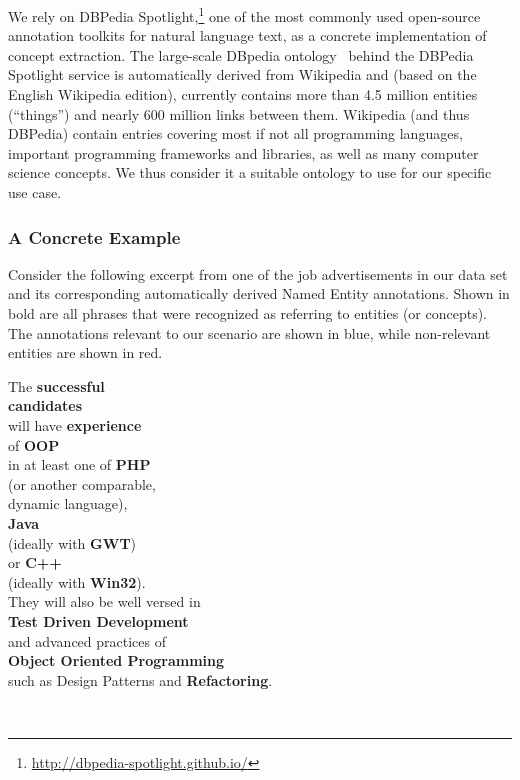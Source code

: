 \documentclass[conference]{IEEEtran}
\begin{document}
We rely on DBPedia Spotlight,\footnote{\url{http://dbpedia-spotlight.github.io/}}
one of the most commonly used open-source annotation toolkits for natural
language text, as a concrete implementation of concept extraction. The
large-scale DBpedia ontology~\cite{mendes2011dbpedia} behind the DBPedia Spotlight service is
automatically derived from Wikipedia and (based on the English Wikipedia edition),
currently contains more than 4.5 million entities (``things'') and nearly 600
million links between them. Wikipedia (and thus DBPedia) contain entries
covering most if not all programming languages, important programming
frameworks and libraries, as well as many computer science concepts. We thus
consider it a suitable ontology to use for our specific use case.

\subsubsection{A Concrete Example}
Consider the following excerpt from one of the job
advertisements in our data set and its corresponding automatically derived Named
Entity annotations. Shown in bold are all phrases that were recognized as
referring to entities (or concepts). The annotations relevant to our scenario
are shown in blue, while non-relevant entities are shown in red.

\vspace{1em}
{\small

\noindent The \textbf{successful} \\
\textbf{candidates}  \\
will have \textbf{experience} \\
of \textbf{OOP} \\
in at least one of \textbf{PHP} \\
(or another comparable,\\
dynamic language), \\
\textbf{Java} \\
(ideally with \textbf{GWT}) \\
or \textbf{C++} \\
(ideally with \textbf{Win32}). \\
They will also be well versed in\\
\textbf{Test Driven Development} \\
and advanced practices of\\
{\footnotesize\textbf{Object Oriented Programming}}  \\
such as Design Patterns and \textbf{Refactoring}. }\\
\end{document}
